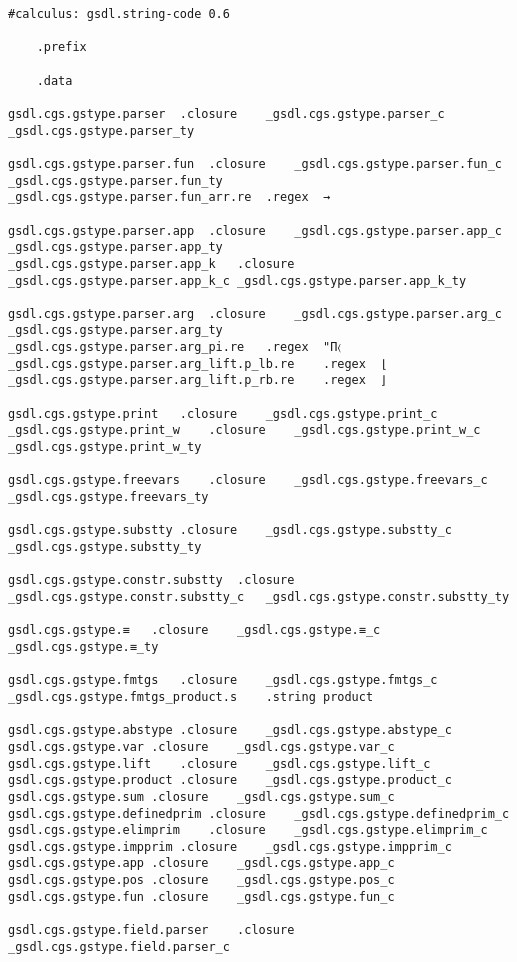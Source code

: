 \documentclass{report}
\begin{document}
\begin{verbatim}
#calculus: gsdl.string-code 0.6

	.prefix

	.data

gsdl.cgs.gstype.parser	.closure	_gsdl.cgs.gstype.parser_c	_gsdl.cgs.gstype.parser_ty

gsdl.cgs.gstype.parser.fun	.closure	_gsdl.cgs.gstype.parser.fun_c	_gsdl.cgs.gstype.parser.fun_ty
_gsdl.cgs.gstype.parser.fun_arr.re	.regex	→

gsdl.cgs.gstype.parser.app	.closure	_gsdl.cgs.gstype.parser.app_c	_gsdl.cgs.gstype.parser.app_ty
_gsdl.cgs.gstype.parser.app_k	.closure	_gsdl.cgs.gstype.parser.app_k_c	_gsdl.cgs.gstype.parser.app_k_ty

gsdl.cgs.gstype.parser.arg	.closure	_gsdl.cgs.gstype.parser.arg_c	_gsdl.cgs.gstype.parser.arg_ty
_gsdl.cgs.gstype.parser.arg_pi.re	.regex	"Π〈
_gsdl.cgs.gstype.parser.arg_lift.p_lb.re	.regex	⌊
_gsdl.cgs.gstype.parser.arg_lift.p_rb.re	.regex	⌋

gsdl.cgs.gstype.print	.closure	_gsdl.cgs.gstype.print_c
_gsdl.cgs.gstype.print_w	.closure	_gsdl.cgs.gstype.print_w_c	_gsdl.cgs.gstype.print_w_ty

gsdl.cgs.gstype.freevars	.closure	_gsdl.cgs.gstype.freevars_c	_gsdl.cgs.gstype.freevars_ty

gsdl.cgs.gstype.substty	.closure	_gsdl.cgs.gstype.substty_c	_gsdl.cgs.gstype.substty_ty

gsdl.cgs.gstype.constr.substty	.closure	_gsdl.cgs.gstype.constr.substty_c	_gsdl.cgs.gstype.constr.substty_ty

gsdl.cgs.gstype.≡	.closure	_gsdl.cgs.gstype.≡_c	_gsdl.cgs.gstype.≡_ty

gsdl.cgs.gstype.fmtgs	.closure	_gsdl.cgs.gstype.fmtgs_c
_gsdl.cgs.gstype.fmtgs_product.s	.string	product

gsdl.cgs.gstype.abstype	.closure	_gsdl.cgs.gstype.abstype_c
gsdl.cgs.gstype.var	.closure	_gsdl.cgs.gstype.var_c
gsdl.cgs.gstype.lift	.closure	_gsdl.cgs.gstype.lift_c
gsdl.cgs.gstype.product	.closure	_gsdl.cgs.gstype.product_c
gsdl.cgs.gstype.sum	.closure	_gsdl.cgs.gstype.sum_c
gsdl.cgs.gstype.definedprim	.closure	_gsdl.cgs.gstype.definedprim_c
gsdl.cgs.gstype.elimprim	.closure	_gsdl.cgs.gstype.elimprim_c
gsdl.cgs.gstype.impprim	.closure	_gsdl.cgs.gstype.impprim_c
gsdl.cgs.gstype.app	.closure	_gsdl.cgs.gstype.app_c
gsdl.cgs.gstype.pos	.closure	_gsdl.cgs.gstype.pos_c
gsdl.cgs.gstype.fun	.closure	_gsdl.cgs.gstype.fun_c

gsdl.cgs.gstype.field.parser	.closure	_gsdl.cgs.gstype.field.parser_c


\end{verbatim}
\end{document}
